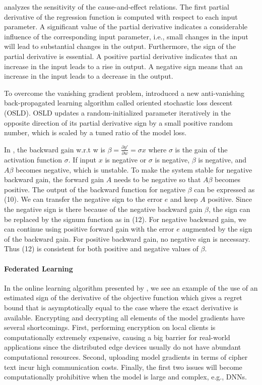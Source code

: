 \documentclass[11pt]{book}
\begin{document}
\cite{gramsch2020analysis} analyzes the sensitivity of the cause-and-effect
relations. The first partial derivative of the regression function
is computed with respect to each input parameter. A significant value
of the partial derivative indicates a considerable influence of the
corresponding input parameter, i.e., small changes in the input will
lead to substantial changes in the output. Furthermore, the sign of
the partial derivative is essential. A positive partial derivative
indicates that an increase in the input leads to a rise in output.
A negative sign means that an increase in the input leads to a decrease
in the output.

To overcome the vanishing gradient problem, \cite{abuqaddom2021oriented}
introduced a new anti-vanishing back-propagated learning algorithm
called oriented stochastic loss descent (OSLD). OSLD updates a random-initialized
parameter iteratively in the opposite direction of its partial derivative
sign by a small positive random number, which is scaled by a tuned
ratio of the model loss.

In \cite{hasan2021training}, the backward gain w.r.t w is $\beta=\frac{\partial y'}{\partial w}=\sigma x$
where $\sigma$ is the gain of the activation function $\sigma$.
If input $x$ is negative or $\sigma$ is negative, $\beta$ is negative,
and $A\beta$ becomes negative, which is unstable. To make the system
stable for negative backward gain, the forward gain $A$ needs to
be negative so that $A\beta$ becomes positive. The output of the
backward function for negative $\beta$ can be expressed as (10).
We can transfer the negative sign to the error $e$ and keep $A$
positive. Since the negative sign is there because of the negative
backward gain $\beta$, the sign can be replaced by the signum function
as in (12). For negative backward gain, we can continue using positive
forward gain with the error $e$ augmented by the sign of the backward
gain. For positive backward gain, no negative sign is necessary. Thus
(12) is consistent for both positive and negative values of $\beta$.

\paragraph{Federated Learning}

In the online learning algorithm presented by \cite{han2020adaptive},
we see an example of the use of an estimated sign of the derivative
of the objective function which gives a regret bound that is asymptotically
equal to the case where the exact derivative is available. Encrypting
and decrypting all elements of the model gradients have several shortcomings.
First, performing encryption on local clients is computationally extremely
expensive, causing a big barrier for real-world applications since
the distributed edge devices usually do not have abundant computational
resources. Second, uploading model gradients in terms of cipher text
incur high communication costs. Finally, the first two issues will
become computationally prohibitive when the model is large and complex,
e.g., DNNs.
\end{document}
